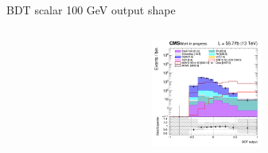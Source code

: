 \documentclass[8pt]{beamer}
\begin{document}
\begin{frame}{BDT scalar 100 GeV output shape}
\begin{columns}
\begin{column}{0.33\textwidth}
\begin{center}
     			\includegraphics[width=1.0\textwidth, height=100pt]{figs/2018/SmearSR-ttDM-scalar100/log_cratio_TTbar_topCR_ll_BDT_ttDM100_TTbar_BDT_output_scalar100_customBinsAttempt7.png}
    		\end{center}		
		\end{column}
\end{columns} \vfill
\end{frame}
\end{document}
